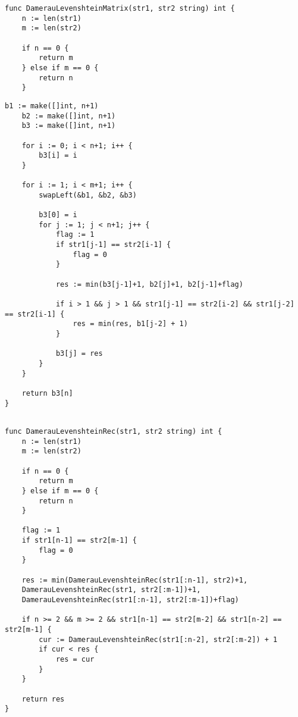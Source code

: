 \begin{lstlisting}[label=lst:DLRec,caption=Функция нахождения расстояния Дамерау-Левенштейна без использованиея рекурсии (начало)]
func DamerauLevenshteinMatrix(str1, str2 string) int {
	n := len(str1)
	m := len(str2)
	
	if n == 0 {
		return m
	} else if m == 0 {
		return n
	}
\end{lstlisting}

\clearpage
\begin{lstlisting}[label=lst:DLRec,caption=Функция нахождения расстояния Дамерау-Левенштейна без использованиея рекурсии (окончание)]	
	b1 := make([]int, n+1)
	b2 := make([]int, n+1)
	b3 := make([]int, n+1)
	
	for i := 0; i < n+1; i++ {
		b3[i] = i
	}
	
	for i := 1; i < m+1; i++ {
		swapLeft(&b1, &b2, &b3)
		
		b3[0] = i
		for j := 1; j < n+1; j++ {
			flag := 1
			if str1[j-1] == str2[i-1] {
				flag = 0
			}
			
			res := min(b3[j-1]+1, b2[j]+1, b2[j-1]+flag)
			
			if i > 1 && j > 1 && str1[j-1] == str2[i-2] && str1[j-2] == str2[i-1] {
				res = min(res, b1[j-2] + 1)
			}
			
			b3[j] = res
		}
	}
	
	return b3[n]
}
	
\end{lstlisting}

\begin{lstlisting}[label=lst:DLRecCache,caption=Функция нахождения расстояния Дамерау-Левенштейна с использованием рекурсии.]
func DamerauLevenshteinRec(str1, str2 string) int {
	n := len(str1)
	m := len(str2)
	
	if n == 0 {
		return m
	} else if m == 0 {
		return n
	}
	
	flag := 1
	if str1[n-1] == str2[m-1] {
		flag = 0
	}
	
	res := min(DamerauLevenshteinRec(str1[:n-1], str2)+1,
	DamerauLevenshteinRec(str1, str2[:m-1])+1,
	DamerauLevenshteinRec(str1[:n-1], str2[:m-1])+flag)
	
	if n >= 2 && m >= 2 && str1[n-1] == str2[m-2] && str1[n-2] == str2[m-1] {
		cur := DamerauLevenshteinRec(str1[:n-2], str2[:m-2]) + 1
		if cur < res {
			res = cur
		}
	}
	
	return res
}
	
\end{lstlisting}

